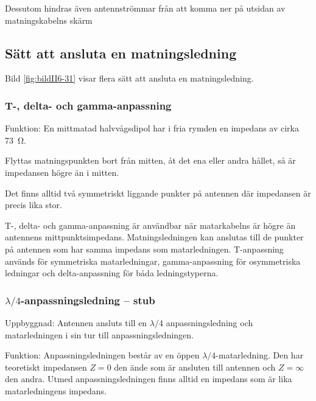 Dessutom hindras även antennströmmar från att komma ner på utsidan av
matningskabelns skärm



\subsection{Sätt att ansluta en matningsledning}

Bild \ref{fig:bildII6-31} visar flera sätt att ansluta en matningsledning.

\subsubsection{T-, delta- och gamma-anpassning}

Funktion:
En mittmatad halvvågsdipol har i fria rymden en impedans av cirka \SI{73}{\ohm}.

Flyttas matningspunkten bort från mitten, åt det ena eller andra hållet, så är
impedansen högre än i mitten.

Det finns alltid två symmetriskt liggande punkter på antennen där
impedansen är precis lika stor.

T-, delta- och gamma-anpassning är användbar när matarkabelns är högre
än antennens mittpunktsimpedans.
Matningsledningen kan anslutas till de punkter på antennen som har samma
impedans som matarledningen.
T-anpassning används för symmetriska matarledningar, gamma-anpassning för
osymmetriska ledningar och delta-anpassning för båda ledningstyperna.

\subsubsection{\(\lambda/4\)-anpassningsledning -- stub}

Uppbyggnad: Antennen ansluts till en \(\lambda/4\) anpassningsledning
och matarledningen i sin tur till anpassningsledningen.

Funktion: Anpassningsledningen består av en öppen \(\lambda/4\)-matarledning.
Den har teoretiskt impedansen \(Z = 0\) den ände som är ansluten till antennen
och \(Z = \infty\) den andra.
Utmed anpassningsledningen finns alltid en impedans som är lika matarledningens
impedans.

